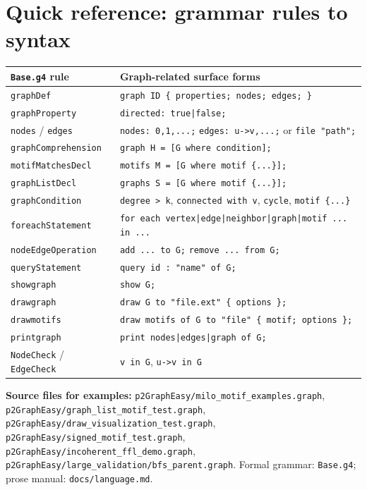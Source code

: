 \documentclass[11pt,a4paper]{article}
\begin{document}
\section{Quick reference: grammar rules to syntax}

\begin{longtable}{@{}p{4.2cm}p{9.8cm}@{}}
\toprule
\texttt{Base.g4} rule & Graph-related surface forms \\
\midrule
\endhead
\texttt{graphDef} & \texttt{graph ID \{ properties; nodes; edges; \}} \\
\texttt{graphProperty} & \texttt{directed: true|false;} \\
\texttt{nodes} / \texttt{edges} & \texttt{nodes: 0,1,...;} \quad \texttt{edges: u->v,...;} or \texttt{file "path";} \\
\texttt{graphComprehension} & \texttt{graph H = [G where condition];} \\
\texttt{motifMatchesDecl} & \texttt{motifs M = [G where motif \{...\}];} \\
\texttt{graphListDecl} & \texttt{graphs S = [G where motif \{...\}];} \\
\texttt{graphCondition} & \texttt{degree > k}, \texttt{connected with v}, \texttt{cycle}, \texttt{motif \{...\}} \\
\texttt{foreachStatement} & \texttt{for each vertex|edge|neighbor|graph|motif ... in ...} \\
\texttt{nodeEdgeOperation} & \texttt{add ... to G;} \quad \texttt{remove ... from G;} \\
\texttt{queryStatement} & \texttt{query id : "name" of G;} \\
\texttt{showgraph} & \texttt{show G;} \\
\texttt{drawgraph} & \texttt{draw G to "file.ext" \{ options \};} \\
\texttt{drawmotifs} & \texttt{draw motifs of G to "file" \{ motif; options \};} \\
\texttt{printgraph} & \texttt{print nodes|edges|graph of G;} \\
\texttt{NodeCheck} / \texttt{EdgeCheck} & \texttt{v in G}, \texttt{u->v in G} \\
\bottomrule
\end{longtable}

\vspace{1em}
\noindent
\textbf{Source files for examples:}
\texttt{p2GraphEasy/milo\_motif\_examples.graph},
\texttt{p2GraphEasy/graph\_list\_motif\_test.graph},
\texttt{p2GraphEasy/draw\_visualization\_test.graph},
\texttt{p2GraphEasy/signed\_motif\_test.graph},
\texttt{p2GraphEasy/incoherent\_ffl\_demo.graph},
\texttt{p2GraphEasy/large\_validation/bfs\_parent.graph}.
Formal grammar: \texttt{Base.g4}; prose manual: \texttt{docs/language.md}.
\end{document}
